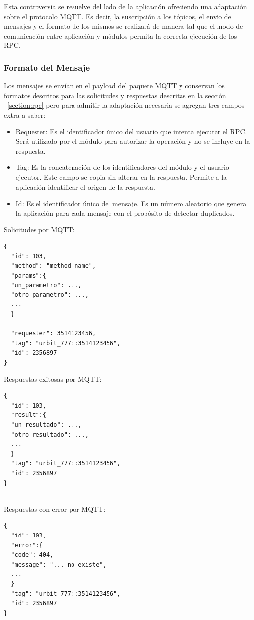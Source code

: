 Esta controversia se resuelve del lado de la aplicación ofreciendo una adaptación sobre el protocolo MQTT.
Es decir, la suscripción a los tópicos, el envío de mensajes y el formato de los mismos se realizará de manera tal que el modo de comunicación entre aplicación y módulos permita la correcta ejecución de los RPC.

\subsubsection{Formato del Mensaje}
Los mensajes se envían en el payload del paquete MQTT y conservan los formatos descritos para las solicitudes y respuestas descritas en la sección ~\ref{section:rpc} pero para admitir la adaptación necesaria se agregan tres campos extra a saber:
\begin{itemize}
	\item Requester: Es el identificador único del usuario que intenta ejecutar el RPC. Será utilizado por el módulo para autorizar la operación y no se incluye en la respuesta.
	\item Tag: Es la concatenación de los identificadores del módulo y el usuario ejecutor. Este campo se copia sin alterar en la respuesta. Permite a la aplicación identificar el origen de la respuesta.
	\item Id: Es el identificador único del mensaje. Es un número aleatorio que genera la aplicación para cada mensaje con el propósito de detectar duplicados.
\end{itemize}

\begin{multicols}{3} %
	
	{\small Solicitudes por MQTT:}
	\begin{lstlisting}
{
  "id": 103,
  "method": "method_name",
  "params":{
  "un_parametro": ...,
  "otro_parametro": ...,
  ...
  }

  "requester": 3514123456,
  "tag": "urbit_777::3514123456",
  "id": 2356897
}
	\end{lstlisting}
	
	\columnbreak %
	
	{\small Respuestas exitosas por MQTT:}
	\begin{lstlisting}
{
  "id": 103,
  "result":{
  "un_resultado": ...,
  "otro_resultado": ...,
  ...
  }
  "tag": "urbit_777::3514123456",
  "id": 2356897
}
	
	\end{lstlisting}
	
	\columnbreak %
	
	{\small Respuestas con error por MQTT:}
	\begin{lstlisting}
{
  "id": 103,
  "error":{
  "code": 404,
  "message": "... no existe",
  ...
  }
  "tag": "urbit_777::3514123456",
  "id": 2356897
}
	
	\end{lstlisting}
	
\end{multicols}

